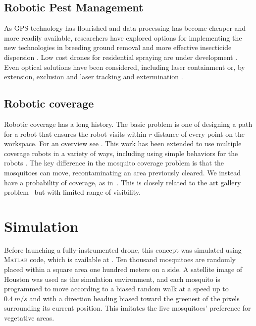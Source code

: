 \documentclass[letterpaper, 10 pt, conference]{ieeeconf}  %
\begin{document}
    \subsection{Robotic Pest Management}
    
As GPS technology has flourished and data processing has become cheaper and more readily available, researchers have explored options for implementing the new technologies in breeding ground removal \cite{anupa2014identification} and more effective insecticide dispersion \cite{hur2015low}.  Low cost drones for residential spraying are under development \cite{amenyo2014medizdroids}.  Even optical solutions have been considered, including laser containment \cite{boonsri2012laser} or, by extension, exclusion and laser tracking and extermination \cite{kare2010build}.
    
    \subsection{Robotic coverage}
    Robotic coverage has a long history. The basic problem is one of designing a path for a robot that ensures the robot visits within $r$ distance of every point on the workspace.  For an overview see \cite{Choset2001}.  This work has been extended to use multiple coverage robots in a variety of ways, including using simple behaviors for the robots \cite{spears2006physics,Koenig2001}.
    The key difference in the mosquito coverage problem is that the mosquitoes can move, recontaminating an area previously cleared. We instead have a probability of coverage, as in~\cite{Das2011}.  This is closely related to the art gallery problem~\cite{lee1986computational} but with limited range of visibility.
   
   
    \section{Simulation}
    
Before launching a fully-instrumented drone, this concept was simulated using \textsc{Matlab} code, which is available at \cite{Burbage2016matlab}.  Ten thousand mosquitoes are randomly placed within a square area one hundred meters on a side.  A satellite image of Houston was used as the simulation environment, and each mosquito is programmed to move according to a biased random walk at a speed up to $0.4~ m/s$ and with a direction heading biased toward the greenest of the pixels surrounding its current position.  This imitates the live mosquitoes' preference for vegetative areas.  
\end{document}
